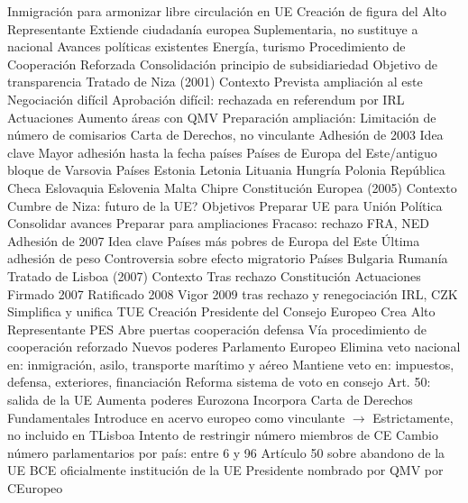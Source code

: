 \documentclass{nuevotema}
\begin{document}
\begin{esquemal}
				\4 Inmigración para armonizar libre circulación en UE
				\4 Creación de figura del Alto Representante
				\4 Extiende ciudadanía europea
				\4[] Suplementaria, no sustituye a nacional
				\4 Avances políticas existentes
				\4 Energía, turismo
				\4 Procedimiento de Cooperación Reforzada
				\4 Consolidación principio de subsidiariedad
				\4 Objetivo de transparencia
		\2 Tratado de Niza (2001)
			\3 Contexto
				\4 Prevista ampliación al este
				\4 Negociación difícil
				\4 Aprobación difícil: rechazada en referendum por IRL
			\3 Actuaciones
				\4 Aumento áreas con QMV
				\4 Preparación ampliación:
				\4[] Limitación de número de comisarios
				\4 Carta de Derechos, no vinculante
		\2 Adhesión de 2003
			\3 Idea clave
				\4 Mayor adhesión hasta la fecha
				 países
				\4 Países de Europa del Este/antiguo bloque de Varsovia
			\3 Países
				\4 Estonia
				\4 Letonia
				\4 Lituania
				\4 Hungría
				\4 Polonia
				\4 República Checa
				\4 Eslovaquia
				\4 Eslovenia
				\4 Malta
				\4 Chipre
		\2 Constitución Europea (2005)
			\3 Contexto
				\4 Cumbre de Niza: futuro de la UE?
			\3 Objetivos
				\4 Preparar UE para Unión Política
				\4 Consolidar avances
				\4 Preparar para ampliaciones
				\4 Fracaso: rechazo FRA, NED
		\2 Adhesión de 2007
			\3 Idea clave
				\4 Países más pobres de Europa del Este
				\4 Última adhesión de peso
				\4 Controversia sobre efecto migratorio
			\3 Países
				\4 Bulgaria
				\4 Rumanía
		\2 Tratado de Lisboa (2007)
			\3 Contexto
				\4 Tras rechazo Constitución
			\3 Actuaciones
				\4 Firmado 2007
				\4 Ratificado 2008
				\4 Vigor 2009 tras rechazo y renegociación IRL, CZK
				\4 Simplifica y unifica TUE
				\4 Creación Presidente del Consejo Europeo
				\4 Crea Alto Representante PES
				\4 Abre puertas cooperación defensa
				\4[] Vía procedimiento de cooperación reforzado
				\4 Nuevos poderes Parlamento Europeo
				\4 Elimina veto nacional en:
				\4[] inmigración, asilo, transporte marítimo y aéreo
				\4 Mantiene veto en:
				\4[] impuestos, defensa, exteriores, financiación
				\4 Reforma sistema de voto en consejo
				\4 Art. 50: salida de la UE
				\4 Aumenta poderes Eurozona
				\4 Incorpora Carta de Derechos Fundamentales
				\4[] Introduce en acervo europeo como vinculante
				\4[] $\to$ Estrictamente, no incluido en TLisboa
				\4 Intento de restringir número miembros de CE
				\4 Cambio número parlamentarios por país:
				\4[] entre 6 y 96
				\4 Artículo 50 sobre abandono de la UE
				\4 BCE oficialmente institución de la UE
				\4[] Presidente nombrado por QMV por CEuropeo

\end{esquemal}
\end{document}
